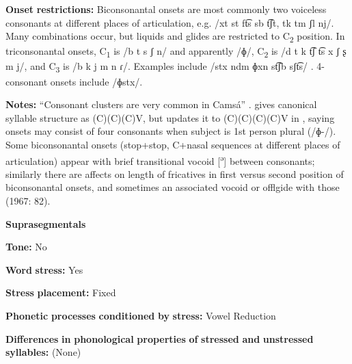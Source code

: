 \documentclass[output=paper]{langsci/langscibook}
\begin{document}
\begin{styleBody}
\textbf{Onset} \textbf{restrictions:} Biconsonantal onsets are most commonly two voiceless consonants at different places of articulation, e.g. /xt st ft͡s sb t͡ʃt, tk tm ʃl nj/. Many combinations occur, but liquids and glides are restricted to C\textsubscript{2} position. In triconsonantal onsets, C\textsubscript{1} is /b t s ʃ n/ and apparently /ɸ/, C\textsubscript{2} is /d t k t͡ʃ t͡s x ʃ ʂ m j/, and C\textsubscript{3} is /b k j m n ɾ/. Examples include /stx ndm ɸxn st͡ʃb sʃt͡s/ . 4-consonant onsets include /ɸstx/.
\end{styleBody}

\begin{styleBody}
\textbf{Notes:} “Consonant clusters are very common in Camsá” \citep[81]{Howard1967}. \citet{Howard1967} gives canonical syllable structure as (C)(C)(C)V, but updates it to (C)(C)(C)(C)V in \citet{Howard1972}, saying onsets may consist of four consonants when subject is 1st person plural (/ɸ{}-/). Some biconsonantal onsets (stop+stop, C+nasal sequences at different places of articulation) appear with brief transitional vocoid [\textsuperscript{ə}] between consonants; similarly there are affects on length of fricatives in first versus second position of biconsonantal onsets, and sometimes an associated vocoid or offlgide with those (1967: 82).
\end{styleBody}

\begin{styleBody}
\textbf{Suprasegmentals}
\end{styleBody}

\begin{styleBody}
\textbf{Tone:} No
\end{styleBody}

\begin{styleBody}
\textbf{Word} \textbf{stress:} Yes
\end{styleBody}

\begin{styleBody}
\textbf{Stress} \textbf{placement:} Fixed
\end{styleBody}

\begin{styleBody}
\textbf{Phonetic} \textbf{processes} \textbf{conditioned} \textbf{by} \textbf{stress:} Vowel Reduction
\end{styleBody}

\begin{styleBody}
\textbf{Differences} \textbf{in} \textbf{phonological} \textbf{properties} \textbf{of} \textbf{stressed} \textbf{and} \textbf{unstressed} \textbf{syllables:} (None)
\end{styleBody}
\end{document}
